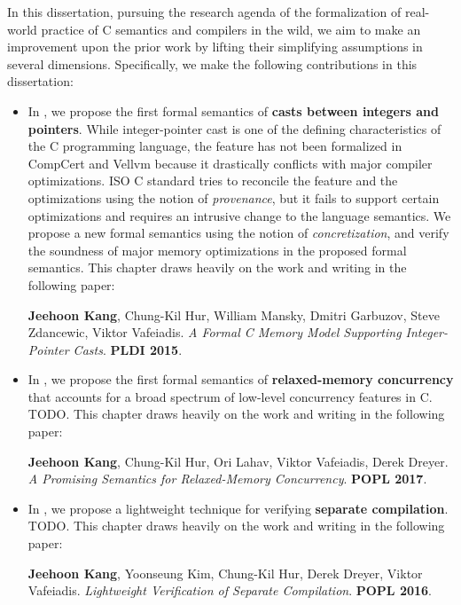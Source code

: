 In this dissertation, pursuing the research agenda of the formalization of real-world practice of C
semantics and compilers in the wild, we aim to make an improvement upon the prior work by lifting
their simplifying assumptions in several dimensions.  Specifically, we make the following
contributions in this dissertation:


%
\begin{itemize}
\item In , we propose the first formal semantics of \textbf{casts between
    integers and pointers}.  While integer-pointer cast is one of the defining characteristics of
  the C programming language, the feature has not been formalized in CompCert and Vellvm because it
  drastically conflicts with major compiler optimizations.  ISO C standard tries to reconcile the
  feature and the optimizations using the notion of \emph{provenance}, but it fails to support
  certain optimizations and requires an intrusive change to the language semantics.  We propose a
  new formal semantics using the notion of \emph{concretization}, and verify the soundness of major
  memory optimizations in the proposed formal semantics.  This chapter draws heavily on the work and
  writing in the following paper:

  {\small \cite{intptrcast} \textbf{Jeehoon Kang}, Chung-Kil Hur, William Mansky, Dmitri Garbuzov,
    Steve Zdancewic, Viktor Vafeiadis.  \emph{A Formal C Memory Model Supporting Integer-Pointer
      Casts}.  \textbf{PLDI 2015}.}

\item In , we propose the first formal semantics of \textbf{relaxed-memory
    concurrency} that accounts for a broad spectrum of low-level concurrency features in C.  TODO.
  This chapter draws heavily on the work and writing in the following paper:

  {\small \cite{promising} \textbf{Jeehoon Kang}, Chung-Kil Hur, Ori Lahav, Viktor Vafeiadis, Derek
    Dreyer.  \emph{A Promising Semantics for Relaxed-Memory Concurrency}.  \textbf{POPL 2017}.}

\item In , we propose a lightweight technique for verifying \textbf{separate
    compilation}.  TODO.  This chapter draws heavily on the work and writing in the following paper:

  {\small \cite{sepcomp} \textbf{Jeehoon Kang}, Yoonseung Kim, Chung-Kil Hur, Derek Dreyer, Viktor
    Vafeiadis.  \emph{Lightweight Verification of Separate Compilation}.  \textbf{POPL 2016}.}
\end{itemize}


